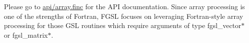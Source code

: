 Please go to \hyperlink{array_8finc}{api/array.\+finc} for the A\+P\+I documentation. Since array processing is one of the strengths of Fortran, F\+G\+S\+L focuses on leveraging Fortran-\/style array processing for those G\+S\+L routines which require arguments of type {\ttfamily fgsl\+\_\+vector$\ast$} or {\ttfamily fgsl\+\_\+matrix$\ast$}. 
